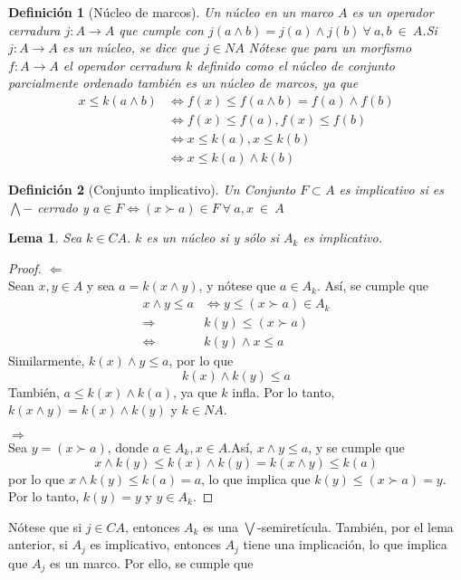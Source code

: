 \documentclass[12pt,letterpaper,titlepage]{article}
\newtheorem*{defn}{Definición}
\newtheorem*{lemma}{Lema}
\theoremstyle{definition}
\newcommand\Sup{\bigvee}
\renewcommand\inf{\wedge}
\newcommand\Inf{\bigwedge}
\newcommand\<{\langle}
\renewcommand\>{\rangle}
\begin{document}
\begin{defn}[Núcleo de marcos]
Un núcleo en un marco $A$ es un operador cerradura $j:A \to A$ que cumple con $j(a\wedge b)=j(a)\wedge j(b) \ \forall \ a,b \ \in \ A$.Si $j:A\to A$ es un núcleo, se dice que $j\in NA$
Nótese que para un morfismo $f: A\to A$ el operador cerradura $k$ definido como el núcleo de conjunto parcialmente ordenado también es un núcleo de marcos, ya que
\begin{align*}
x\leq k(a\wedge b)&\iff f(x)\leq f(a\wedge b)=f(a)\wedge f(b)\\
&\iff f(x)\leq f(a) , f(x)\leq f(b) \\
&\iff x\leq k(a), x\leq k(b)\\
& \iff x\leq k(a)\wedge k(b)
\end{align*}
\end{defn}
\begin{defn}[Conjunto implicativo]
Un Conjunto $F\subset A$ es implicativo si es $\Inf-$ cerrado y $a\in F \iff (x\succ a)\in F \ \forall \ a,x \ \in \ A$
\end{defn}
\begin{lemma}
Sea $k\in CA$. $k$ es un núcleo si  y sólo si $A_k$ es implicativo.
\end{lemma}
\begin{proof}
$\Leftarrow$\\
Sean $x,y \in A$ y sea $a=k(x\inf y)$, y nótese que $a\in A_k$. Así, se cumple que 
\begin{align*}
    x\inf y\leq a & \iff y\leq (x\succ a)\in A_k\\
    \Rightarrow & k(y)\leq (x\succ a)\\
    \iff & k(y)\inf x\leq a
\end{align*}
Similarmente, $k(x)\inf y\leq a$, por lo que 
$$ k(x)\inf k(y)\leq a$$
También, $a\leq k(x)\inf k(a)$, ya que $k$ infla. Por lo tanto, $k(x\inf y)=k(x)\inf k(y)$ y $k\in NA$.\vspace{5mm}

$\Rightarrow$\\
Sea $y=(x\succ a)$, donde $a\in A_k, x\in A$.Así, $x\inf y\leq a$, y se cumple que 
$$x\inf k(y)\leq k(x)\inf k(y) =k(x\inf y)\leq k(a)$$
por lo que $x\inf k(y)\leq k(a)=a$, lo que implica que $k(y)\leq (x\succ a)=y$. Por lo tanto, $k(y)=y$ y $y\in A_k$.
\end{proof}
Nótese que si $j\in CA$, entonces $A_k$ es una $\Sup$-semiretícula. También, por el lema anterior, si $A_j$ es implicativo, entonces $A_j$ tiene una implicación, lo que implica que $A_j$ es un marco. Por ello, se cumple que 
\end{document}
